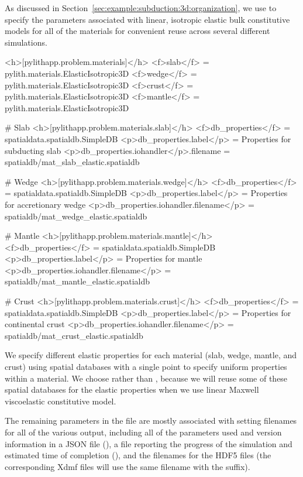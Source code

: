 As discussed in Section~\vref{sec:example:subduction:3d:organization},
we use  to specify the parameters
associated with linear, isotropic elastic bulk constitutive models for
all of the materials for convenient reuse across several different
simulations.
\begin{cfg}
<h>[pylithapp.problem.materials]</h>
<f>slab</f> = pylith.materials.ElasticIsotropic3D
<f>wedge</f> = pylith.materials.ElasticIsotropic3D
<f>crust</f> = pylith.materials.ElasticIsotropic3D
<f>mantle</f> = pylith.materials.ElasticIsotropic3D

# Slab
<h>[pylithapp.problem.materials.slab]</h>
<f>db_properties</f> = spatialdata.spatialdb.SimpleDB
<p>db_properties.label</p> = Properties for subducting slab
<p>db_properties.iohandler</p>.filename = spatialdb/mat_slab_elastic.spatialdb

# Wedge
<h>[pylithapp.problem.materials.wedge]</h>
<f>db_properties</f> = spatialdata.spatialdb.SimpleDB
<p>db_properties.label</p> = Properties for accretionary wedge
<p>db_properties.iohandler.filename</p> = spatialdb/mat_wedge_elastic.spatialdb

# Mantle
<h>[pylithapp.problem.materials.mantle]</h>
<f>db_properties</f> = spatialdata.spatialdb.SimpleDB
<p>db_properties.label</p> = Properties for mantle
<p>db_properties.iohandler.filename</p> = spatialdb/mat_mantle_elastic.spatialdb

# Crust
<h>[pylithapp.problem.materials.crust]</h>
<f>db_properties</f> = spatialdata.spatialdb.SimpleDB
<p>db_properties.label</p> = Properties for continental crust
<p>db_properties.iohandler.filename</p> = spatialdb/mat_crust_elastic.spatialdb
\end{cfg}
We specify different elastic properties for each material
(slab, wedge, mantle, and crust) using  spatial
databases with a single point to specify uniform properties within a
material. We choose  rather than ,
because we will reuse some of these spatial databases for the elastic
properties when we use linear Maxwell viscoelastic constitutive model.

The remaining parameters in the  file are mostly
associated with setting filenames for all of the various output,
including all of the parameters used and version information in a JSON
file (), a file reporting the
progress of the simulation and estimated time of completion
(), and the filenames for the
HDF5 files (the corresponding Xdmf files will use the same filename
with the  suffix).

